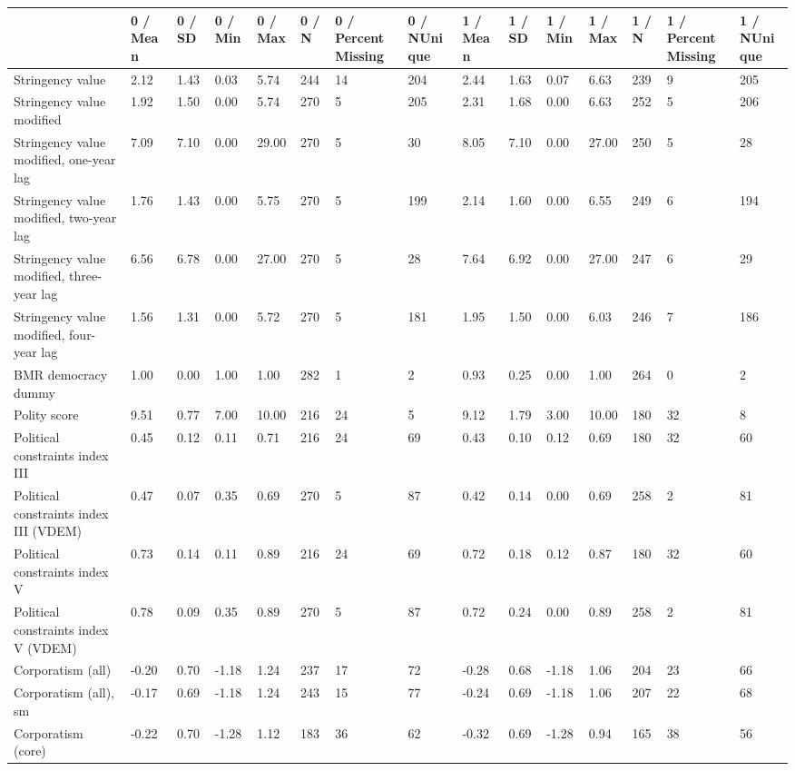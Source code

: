 
\begin{longtable}{lllllllllllllll}
\toprule
  & 0 / Mean & 0 / SD & 0 / Min & 0 / Max & 0 / N & 0 / PercentMissing & 0 / NUnique & 1 / Mean & 1 / SD & 1 / Min & 1 / Max & 1 / N & 1 / PercentMissing & 1 / NUnique\\
\midrule
Stringency value & 2.12 & 1.43 & 0.03 & 5.74 & 244 & 14 & 204 & 2.44 & 1.63 & 0.07 & 6.63 & 239 & 9 & 205\\
Stringency value modified & 1.92 & 1.50 & 0.00 & 5.74 & 270 & 5 & 205 & 2.31 & 1.68 & 0.00 & 6.63 & 252 & 5 & 206\\
Stringency value modified, one-year lag & 7.09 & 7.10 & 0.00 & 29.00 & 270 & 5 & 30 & 8.05 & 7.10 & 0.00 & 27.00 & 250 & 5 & 28\\
Stringency value modified, two-year lag & 1.76 & 1.43 & 0.00 & 5.75 & 270 & 5 & 199 & 2.14 & 1.60 & 0.00 & 6.55 & 249 & 6 & 194\\
Stringency value modified, three-year lag & 6.56 & 6.78 & 0.00 & 27.00 & 270 & 5 & 28 & 7.64 & 6.92 & 0.00 & 27.00 & 247 & 6 & 29\\
\addlinespace
Stringency value modified, four-year lag & 1.56 & 1.31 & 0.00 & 5.72 & 270 & 5 & 181 & 1.95 & 1.50 & 0.00 & 6.03 & 246 & 7 & 186\\
BMR democracy dummy & 1.00 & 0.00 & 1.00 & 1.00 & 282 & 1 & 2 & 0.93 & 0.25 & 0.00 & 1.00 & 264 & 0 & 2\\
Polity score & 9.51 & 0.77 & 7.00 & 10.00 & 216 & 24 & 5 & 9.12 & 1.79 & 3.00 & 10.00 & 180 & 32 & 8\\
Political constraints index III & 0.45 & 0.12 & 0.11 & 0.71 & 216 & 24 & 69 & 0.43 & 0.10 & 0.12 & 0.69 & 180 & 32 & 60\\
Political constraints index III (VDEM) & 0.47 & 0.07 & 0.35 & 0.69 & 270 & 5 & 87 & 0.42 & 0.14 & 0.00 & 0.69 & 258 & 2 & 81\\
\addlinespace
Political constraints index V & 0.73 & 0.14 & 0.11 & 0.89 & 216 & 24 & 69 & 0.72 & 0.18 & 0.12 & 0.87 & 180 & 32 & 60\\
Political constraints index V (VDEM) & 0.78 & 0.09 & 0.35 & 0.89 & 270 & 5 & 87 & 0.72 & 0.24 & 0.00 & 0.89 & 258 & 2 & 81\\
Corporatism (all) & -0.20 & 0.70 & -1.18 & 1.24 & 237 & 17 & 72 & -0.28 & 0.68 & -1.18 & 1.06 & 204 & 23 & 66\\
Corporatism (all), sm & -0.17 & 0.69 & -1.18 & 1.24 & 243 & 15 & 77 & -0.24 & 0.69 & -1.18 & 1.06 & 207 & 22 & 68\\
Corporatism (core) & -0.22 & 0.70 & -1.28 & 1.12 & 183 & 36 & 62 & -0.32 & 0.69 & -1.28 & 0.94 & 165 & 38 & 56\\

\end{longtable}
